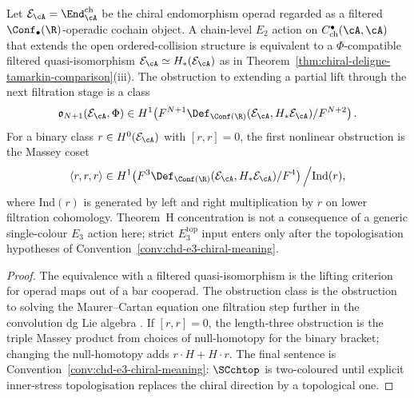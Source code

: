 \begin{proposition}%
\label{rem:e1-chiral-deligne-chain-level-obstruction}%
%
%
Let $\mathcal E_\cA=\End^{\mathrm{ch}}_\cA$ be the chiral
endomorphism operad regarded as a filtered
$\Conf_\bullet(\R)$-operadic cochain object. A chain-level
$E_2$ action on $C^\bullet_{\mathrm{ch}}(\cA,\cA)$ that extends the
open ordered-collision structure is equivalent to a
$\Phi$-compatible filtered quasi-isomorphism
$\mathcal E_\cA\simeq H_\ast(\mathcal E_\cA)$ as in
Theorem~\ref{thm:chiral-deligne-tamarkin-comparison}(iii). The
obstruction to extending a partial lift through the next filtration
stage is a class
\[
\mathfrak o_{N+1}(\mathcal E_\cA,\Phi)
\in
H^1\!\left(
F^{N+1}\Def_{\Conf(\R)}(\mathcal E_\cA,H_\ast\mathcal E_\cA)/
F^{N+2}
\right).
\]
For a binary class $r\in H^0(\mathcal E_\cA)$ with $[r,r]=0$, the
first nonlinear obstruction is the Massey coset
\[
\langle r,r,r\rangle
\in
H^1\!\left(F^3\Def_{\Conf(\R)}(\mathcal E_\cA,H_\ast\mathcal E_\cA)/
F^4\right)\Big/\mathrm{Ind}(r),
\]
where $\mathrm{Ind}(r)$ is generated by left and right multiplication
by $r$ on lower filtration cohomology. Theorem~H concentration is not
a consequence of a generic single-colour $E_3$ action here; strict
$E_3^{\mathrm{top}}$ input enters only after the topologisation
hypotheses of Convention~\ref{conv:chd-e3-chiral-meaning}.
\end{proposition}

\begin{proof}
The equivalence with a filtered quasi-isomorphism is the lifting
criterion for operad maps out of a bar cooperad. The obstruction class
is the obstruction to solving the Maurer--Cartan equation one
filtration step further in the convolution dg Lie algebra
\cite[Ch.~6]{LV12}. If $[r,r]=0$, the length-three obstruction is the
triple Massey product from choices of null-homotopy for the
binary bracket; changing the null-homotopy adds
$r\cdot H+H\cdot r$. The final sentence is
Convention~\ref{conv:chd-e3-chiral-meaning}: $\SCchtop$ is
two-coloured until explicit inner-stress topologisation replaces the chiral direction by a topological one.
\end{proof}

